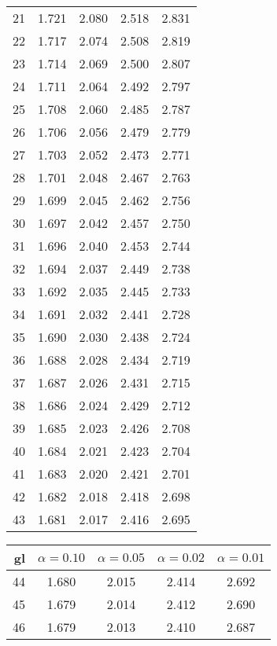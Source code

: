 {\begin{minipage}[t]{0.485\linewidth}
\begin{tabular}{r|cccc}
21  & 1.721  & 2.080  & 2.518  & 2.831 \\
22  & 1.717  & 2.074  & 2.508  & 2.819 \\
23  & 1.714  & 2.069  & 2.500  & 2.807 \\
24  & 1.711  & 2.064  & 2.492  & 2.797 \\
25  & 1.708  & 2.060  & 2.485  & 2.787 \\
26  & 1.706  & 2.056  & 2.479  & 2.779 \\
27  & 1.703  & 2.052  & 2.473  & 2.771 \\
28  & 1.701  & 2.048  & 2.467  & 2.763 \\
29  & 1.699  & 2.045  & 2.462  & 2.756 \\
30  & 1.697  & 2.042  & 2.457  & 2.750 \\
31  & 1.696  & 2.040  & 2.453  & 2.744 \\
32  & 1.694  & 2.037  & 2.449  & 2.738 \\
33  & 1.692  & 2.035  & 2.445  & 2.733 \\
34  & 1.691  & 2.032  & 2.441  & 2.728 \\
35  & 1.690  & 2.030  & 2.438  & 2.724 \\
36  & 1.688  & 2.028  & 2.434  & 2.719 \\
37  & 1.687  & 2.026  & 2.431  & 2.715 \\
38  & 1.686  & 2.024  & 2.429  & 2.712 \\
39  & 1.685  & 2.023  & 2.426  & 2.708 \\
40  & 1.684  & 2.021  & 2.423  & 2.704 \\
41  & 1.683  & 2.020  & 2.421  & 2.701 \\
42  & 1.682  & 2.018  & 2.418  & 2.698 \\
43  & 1.681  & 2.017  & 2.416  & 2.695 \\
\bottomrule
\end{tabular}
\end{minipage}\hspace{0.02\linewidth}%
\begin{minipage}[t]{0.485\linewidth}
\centering\footnotesize
\begin{tabular}{r|cccc}
\toprule
\textbf{gl} & $\alpha=0.10$ & $\alpha=0.05$ & $\alpha=0.02$ & $\alpha=0.01$ \\
\midrule
44  & 1.680  & 2.015  & 2.414  & 2.692 \\
45  & 1.679  & 2.014  & 2.412  & 2.690 \\
46  & 1.679  & 2.013  & 2.410  & 2.687 \\

\end{tabular}
\end{minipage}}
